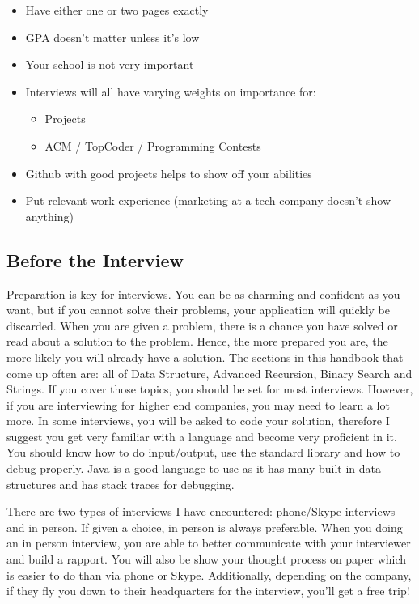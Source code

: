 \documentclass[11pt,oneside]{book}
\begin{document}
\begin{itemize}
\item Have either one or two pages exactly
\item GPA doesn't matter unless it's low
\item Your school is not very important
\item Interviews will all have varying weights on importance for:

\begin{itemize}
\item Projects
\item ACM / TopCoder / Programming Contests
\end{itemize}
\item Github with good projects helps to show off your abilities
\item Put relevant work experience (marketing at a tech company doesn't show anything)
\end{itemize}

\subsection{Before the Interview}

Preparation is key for interviews. You can be as charming and confident as you want, but
    if you cannot solve their problems, your application will quickly be discarded. When you 
    are given a problem, there is a chance you have solved or read about a solution to the
    problem. Hence, the more prepared you are, the more likely you will already have a 
    solution. The sections in this handbook that come up often are: all of Data Structure,
    Advanced Recursion, Binary Search and Strings. If you cover those topics, you should be set 
    for most interviews. However, if you are interviewing for higher end companies, you may need to learn
    a lot more. In some interviews, you will be asked to code your solution, therefore I suggest you 
    get very familiar with a language and become very proficient in it. You should know how to 
    do input/output, use the standard library and how to debug properly. Java is a good language to use
    as it has many built in data structures and has stack traces for debugging.

There are two types of interviews I have encountered: phone/Skype interviews and in person. 
    If given a choice, in person is always preferable. When you doing an in person interview, 
    you are able to better communicate with your interviewer and build a rapport. You will also be 
    show your thought process on paper which is easier to do than via phone or Skype. Additionally, 
    depending on the company, if they fly you down to their headquarters for the interview, 
    you'll get a free trip!
\end{document}
